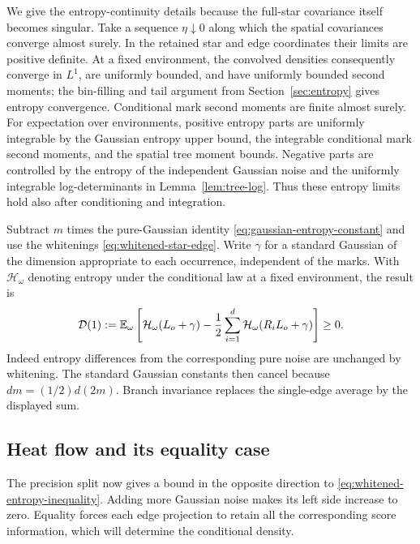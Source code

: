 We give the entropy-continuity details because the full-star
covariance itself becomes singular.  Take a sequence
\(\eta\downarrow0\) along which the spatial covariances converge
almost surely.  In the retained star and edge coordinates their
limits are positive definite.  At a fixed environment, the
convolved densities consequently converge in \(L^1\), are
uniformly bounded, and have uniformly bounded second moments;
the bin-filling and tail argument from
Section~\ref{sec:entropy} gives entropy convergence.  Conditional
mark second moments are finite almost surely.  For expectation
over environments, positive entropy parts are uniformly
integrable by the Gaussian entropy upper bound, the integrable
conditional mark second moments, and the spatial tree moment
bounds.  Negative parts are controlled by the entropy of the
independent Gaussian noise and the uniformly integrable
log-determinants in Lemma~\ref{lem:tree-log}.  Thus these entropy
limits hold also after conditioning and integration.

Subtract \(m\) times the pure-Gaussian identity
\eqref{eq:gaussian-entropy-constant} and use the whitenings
\eqref{eq:whitened-star-edge}.  Write \(\gamma\) for a standard
Gaussian of the dimension appropriate to each occurrence,
independent of the marks.  With \(\mathcal H_\omega\) denoting
entropy under the conditional law at a fixed environment, the
result is
\begin{equation}\label{eq:whitened-entropy-inequality}
 \mathcal D(1):=
 \mathbb E_\omega\left[
 \mathcal H_\omega(L_o+\gamma)
 -\frac12\sum_{i=1}^d
      \mathcal H_\omega(R_iL_o+\gamma)\right]\ge0.
\end{equation}
Indeed entropy differences from the corresponding pure noise
are unchanged by whitening.  The standard Gaussian constants
then cancel because \(dm=(1/2)d(2m)\).  Branch invariance
replaces the single-edge average by the displayed sum.

\subsection{Heat flow and its equality case}

The precision split now gives a bound in the opposite direction
to \eqref{eq:whitened-entropy-inequality}.  Adding more Gaussian
noise makes its left side increase to zero.  Equality forces
each edge projection to retain all the corresponding score
information, which will determine the conditional density.

